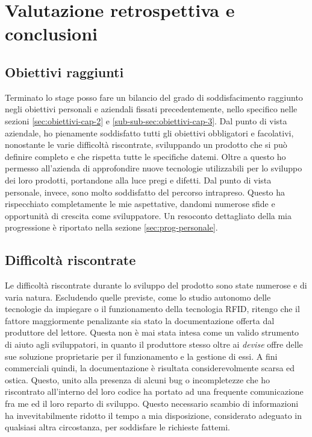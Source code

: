 
\chapter{Valutazione retrospettiva e conclusioni}
\label{cap:conclusioni}


\section{Obiettivi raggiunti}
Terminato lo stage posso fare un bilancio del grado di soddisfacimento raggiunto negli obiettivi 
personali e aziendali fissati precedentemente, nello specifico nelle sezioni \ref{sec:obiettivi-cap-2} e \ref{sub-sub-sec:obiettivi-cap-3}.
Dal punto di vista aziendale, ho pienamente soddisfatto tutti gli obiettivi obbligatori e facolativi, nonostante le varie difficoltà riscontrate,
sviluppando un prodotto che si può definire completo e che rispetta tutte le specifiche datemi. Oltre a questo ho permesso all'azienda
di approfondire nuove tecnologie utilizzabili per lo sviluppo dei loro prodotti, portandone alla luce pregi e difetti.
Dal punto di vista personale, invece, sono molto soddisfatto del percorso intrapreso. Questo ha rispecchiato completamente le mie
aspettative, dandomi numerose sfide e opportunità di crescita come sviluppatore. Un resoconto  dettagliato della mia progressione
è riportato nella sezione \ref{sec:prog-personale}.

\section{Difficoltà riscontrate}
Le difficoltà riscontrate durante lo sviluppo del prodotto sono state numerose e di varia natura. Escludendo quelle previste,
come lo studio autonomo delle tecnologie da impiegare o il funzionamento della tecnologia RFID, ritengo che il fattore maggiormente
penalizante sia stato la documentazione offerta dal produttore del lettore. Questa non è mai stata intesa come un valido strumento di aiuto agli sviluppatori,
in quanto il produttore stesso oltre ai \emph{devise} offre delle sue soluzione proprietarie per il funzionamento e la gestione di essi.
A fini commerciali quindi, la documentazione è risultata considerevolmente scarsa ed ostica.
Questo, unito alla presenza di alcuni bug o incompletezze che ho riscontrato all'interno del loro codice ha portato ad una frequente comunicazione fra me ed il loro reparto di sviluppo.
Questo necessario scambio di informazioni ha invevitabilmente ridotto il tempo a mia disposizione, considerato adeguato in qualsiasi altra circostanza, per soddisfare le richieste fattemi.

